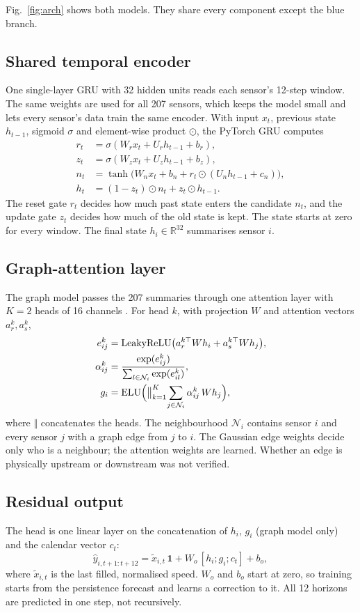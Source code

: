 \documentclass[conference]{IEEEtran}
\begin{document}
Fig.~\ref{fig:arch} shows both models. They share every component except the blue branch.

\subsection{Shared temporal encoder}
One single-layer GRU with 32 hidden units reads each sensor's 12-step window. The same weights are used for all 207 sensors, which keeps the model small and lets every sensor's data train the same encoder. With input $x_t$, previous state $h_{t-1}$, sigmoid $\sigma$ and element-wise product $\odot$, the PyTorch GRU computes \cite{cho,torchgru}
\begin{align}
r_t&=\sigma(W_r x_t+U_r h_{t-1}+b_r),\\
z_t&=\sigma(W_z x_t+U_z h_{t-1}+b_z),\\
n_t&=\tanh\bigl(W_n x_t+b_n+r_t\odot(U_n h_{t-1}+c_n)\bigr),\\
h_t&=(1-z_t)\odot n_t+z_t\odot h_{t-1}.
\end{align}
The reset gate $r_t$ decides how much past state enters the candidate $n_t$, and the update gate $z_t$ decides how much of the old state is kept. The state starts at zero for every window. The final state $h_i\in\mathbb{R}^{32}$ summarises sensor $i$.

\subsection{Graph-attention layer}
The graph model passes the 207 summaries through one attention layer with $K=2$ heads of 16 channels \cite{gat}. For head $k$, with projection $W$ and attention vectors $a_r^{k},a_s^{k}$,
\begin{align}
e_{ij}^{k}&=\operatorname{LeakyReLU}\bigl(a_r^{k\top}Wh_i+a_s^{k\top}Wh_j\bigr),\\
\alpha_{ij}^{k}&=\frac{\exp(e_{ij}^{k})}{\sum_{l\in\mathcal N_i}\exp(e_{il}^{k})},\\
g_i&=\operatorname{ELU}\Bigl(\bigl\Vert_{k=1}^{K}\sum_{j\in\mathcal N_i}\alpha_{ij}^{k}\,Wh_j\Bigr),
\end{align}
where $\Vert$ concatenates the heads. The neighbourhood $\mathcal N_i$ contains sensor $i$ and every sensor $j$ with a graph edge from $j$ to $i$. The Gaussian edge weights decide only who is a neighbour; the attention weights are learned. Whether an edge is physically upstream or downstream was not verified.

\subsection{Residual output}
The head is one linear layer on the concatenation of $h_i$, $g_i$ (graph model only) and the calendar vector $c_t$:
\begin{equation}
\hat y_{i,t+1:t+12}=\tilde x_{i,t}\,\mathbf 1+W_o\,[h_i;g_i;c_t]+b_o ,
\end{equation}
where $\tilde x_{i,t}$ is the last filled, normalised speed. $W_o$ and $b_o$ start at zero, so training starts from the persistence forecast and learns a correction to it. All 12 horizons are predicted in one step, not recursively.
\end{document}
